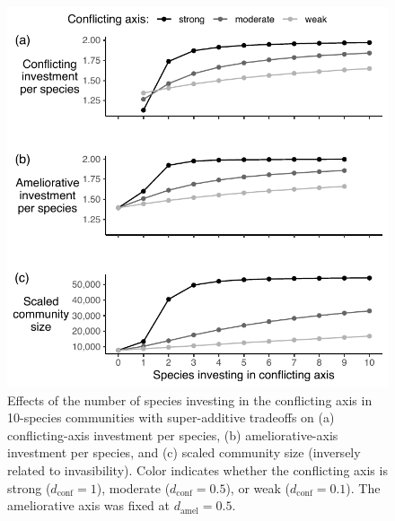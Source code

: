 \documentclass[12pt]{article}
\begin{document}
\begin{figure}[ht!]
\centering
\includegraphics{4-stab.pdf}
\caption{Effects of the number of species investing in the conflicting axis
in 10-species communities with super-additive tradeoffs on 
(a) conflicting-axis investment per species,
(b) ameliorative-axis investment per species, and 
(c) scaled community size (inversely related to invasibility).
Color indicates whether the conflicting axis is strong ($d_{\text{conf}} = 1$),
moderate ($d_{\text{conf}} = 0.5$), or weak ($d_{\text{conf}} = 0.1$).
The ameliorative axis was fixed at $d_{\text{amel}} = 0.5$.
\label{fig:stabilizers}
}
\end{figure}
\end{document}
